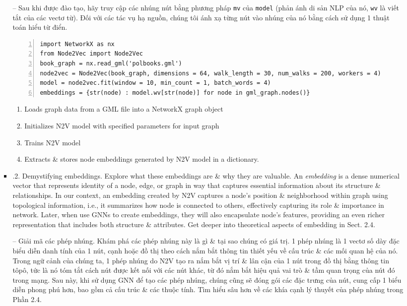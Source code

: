 \documentclass{article}
\begin{document}
\begin{itemize}
\begin{itemize}
\begin{itemize}
           -- Sau khi được đào tạo, hãy truy cập các nhúng nút bằng phương pháp {\tt mv} của {\tt model} (phản ánh di sản NLP của nó, {\tt wv} là viết tắt của các vectơ từ). Đối với các tác vụ hạ nguồn, chúng tôi ánh xạ từng nút vào nhúng của nó bằng cách sử dụng 1 thuật toán hiểu từ điển.
           \begin{Verbatim}[numbers=left,xleftmargin=5mm]
import NetworkX as nx
from Node2Vec import Node2Vec
book_graph = nx.read_gml('polbooks.gml')
node2vec = Node2Vec(book_graph, dimensions = 64, walk_length = 30, num_walks = 200, workers = 4)
model = node2vec.fit(window = 10, min_count = 1, batch_words = 4)
embeddings = {str(node) : model.wv[str(node)] for node in gml_graph.nodes()}
           \end{Verbatim}
           \begin{enumerate}
               \item Loads graph data from a GML file into a NetworkX graph object
               \item Initializes N2V model with specified parameters for input graph
               \item Trains N2V model
               \item Extracts \& stores node embeddings generated by N2V model in a dictionary.
           \end{enumerate}
           \item {.2. Demystifying embeddings.} Explore what these embeddings are \& why they are valuable. An {\it embedding} is a dense numerical vector that represents identity of a node, edge, or graph in way that captures essential information about its structure \& relationships. In our context, an embedding created by N2V captures a node's position \& neighborhood within graph using topological information, i.e., it summarizes how node is connected to others, effectively capturing its role \& importance in network. Later, when use GNNs to create embeddings, they will also encapsulate node's features, providing an even richer representation that includes both structure \& attributes. Get deeper into theoretical aspects of embedding in Sect. 2.4.

           -- {\sf Giải mã các phép nhúng.} Khám phá các phép nhúng này là gì \& tại sao chúng có giá trị. 1 phép nhúng {\it} là 1 vectơ số dày đặc biểu diễn danh tính của 1 nút, cạnh hoặc đồ thị theo cách nắm bắt thông tin thiết yếu về cấu trúc \& các mối quan hệ của nó. Trong ngữ cảnh của chúng ta, 1 phép nhúng do N2V tạo ra nắm bắt vị trí \& lân cận của 1 nút trong đồ thị bằng thông tin tôpô, tức là nó tóm tắt cách nút được kết nối với các nút khác, từ đó nắm bắt hiệu quả vai trò \& tầm quan trọng của nút đó trong mạng. Sau này, khi sử dụng GNN để tạo các phép nhúng, chúng cũng sẽ đóng gói các đặc trưng của nút, cung cấp 1 biểu diễn phong phú hơn, bao gồm cả cấu trúc \& các thuộc tính. Tìm hiểu sâu hơn về các khía cạnh lý thuyết của phép nhúng trong Phần 2.4.


\end{itemize}
\end{itemize}
\end{itemize}
\end{document}
